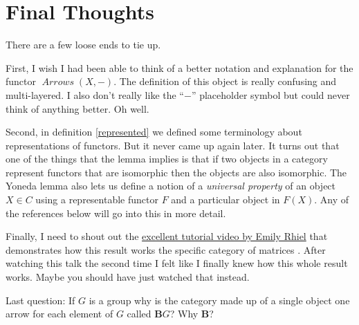 \documentclass[12pt]{article}
\theoremstyle{definition}
\theoremstyle{definition}
\theoremstyle{definition}
\numberwithin{equation}{section}
\DeclareMathOperator{\Arrows}{\mathit{Arrows}}
\begin{document}
\section{Final Thoughts}

There are a few loose ends to tie up.

First, I wish I had been able to think of a better notation and explanation for the functor 
$\Arrows(X, -)$. The definition of this object is really confusing and multi-layered. 
I also don't really like the ``$-$'' placeholder symbol but could 
never think of anything better. Oh well.

Second, in definition \ref{represented} we defined some terminology about 
representations of functors. But 
it never came up again later. It turns out that one 
of the things that the lemma implies is that if two objects 
in a category represent functors that are isomorphic
then the objects are also isomorphic. The Yoneda lemma also lets us define a notion of a {\it universal property} 
of an object $X \in C$ using a representable functor $F$ and a particular object in $F(X)$.
Any of the references below will go into this in more detail.

Finally, I need to shout out the 
\href{https://www.youtube.com/watch?v=SsgEvrDFJsM}{excellent tutorial video by Emily Rhiel} 
that demonstrates how this result works
the specific category of matrices \cite{Rhiel2020}. After watching this talk the second time
I felt like I finally knew how this whole result works. Maybe you should have just watched that instead.

Last question: If $G$ is a group why is the category made up of a single object
one arrow for each element of $G$ called ${\mathbf B}G$? Why {\bf B}?
\end{document}
